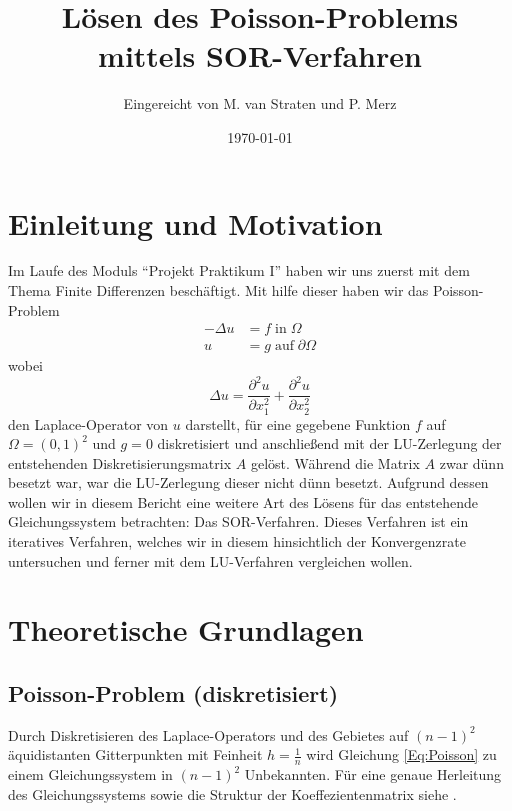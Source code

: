 \documentclass{scrartcl}
\title{Lösen des Poisson-Problems mittels SOR-Verfahren}
\author{%
  Eingereicht von M. van Straten und P. Merz
}
\date{\today}
\begin{document}
\maketitle
\tableofcontents
\cleardoublepage%


\section{Einleitung und Motivation}

Im Laufe des Moduls ``Projekt Praktikum I'' haben wir uns zuerst mit dem Thema
Finite Differenzen beschäftigt. Mit hilfe dieser haben wir das Poisson-Problem
\begin{align}\label{Eq:Poisson}
    -\Delta u & = f \; \text{in} \; \Omega           \\
    u         & = g \; \text{auf} \; \partial \Omega
\end{align}
wobei
\begin{equation*}
    \Delta u = \frac{\partial^2 u}{\partial x_1^2} + \frac{\partial^2 u}{\partial x_2^2}
\end{equation*}
den Laplace-Operator von \(u\) darstellt, für eine gegebene Funktion \(f\)
auf \(\Omega = {(0, 1)}^2\) und \(g = 0\) diskretisiert und anschließend mit
der LU-Zerlegung der entstehenden Diskretisierungsmatrix \(A\) gelöst. Während die Matrix \(A\) zwar dünn besetzt war,
war die LU-Zerlegung dieser nicht dünn besetzt. Aufgrund dessen wollen wir in diesem Bericht eine weitere Art des
Lösens für das entstehende Gleichungssystem betrachten: Das SOR-Verfahren. Dieses Verfahren ist ein iteratives Verfahren, welches wir in diesem hinsichtlich der Konvergenzrate untersuchen und ferner mit dem LU-Verfahren vergleichen wollen.

\section{Theoretische Grundlagen}

\subsection{Poisson-Problem (diskretisiert)}

Durch Diskretisieren des Laplace-Operators und des Gebietes auf \((n-1)^2\)
äquidistanten Gitterpunkten mit Feinheit \(h=\frac{1}{n}\) wird Gleichung
\ref{Eq:Poisson} zu einem Gleichungssystem in \((n-1)^2\) Unbekannten. Für eine
genaue Herleitung des Gleichungssystems sowie die Struktur der
Koeffezientenmatrix siehe \cite{HandoutLU}.
\end{document}
